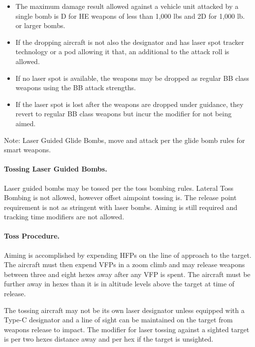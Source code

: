 \begin{itemize}

    \item The maximum damage result allowed against a vehicle unit attacked by a single bomb is D for HE weapons of less than 1,000 lbs and 2D for 1,000 lb. or larger bombs.

    \item If the dropping aircraft is not also the designator and has laser spot tracker technology or a pod allowing it that, an additional  to the attack roll is allowed.

    \item If no laser spot is available, the weapons may be dropped as regular BB class weapons using the BB attack strengths.

    \item {}If the laser spot is lost after the weapons are dropped under guidance, they revert to regular BB class weapons but incur the  modifier for not being aimed.

\end{itemize}

Note: Laser Guided Glide Bombs, move and attack per the glide bomb rules for smart weapons.

\paragraph{Tossing Laser Guided Bombs.} Laser guided bombs may be tossed per the toss bombing rules. Lateral Toss Bombing is not allowed, however offset aimpoint tossing is. The release point requirement is not as stringent with laser bombs. Aiming is still required and tracking time modifiers are not allowed.

\paragraph{Toss Procedure.} Aiming is accomplished by expending HFPs on the line of approach to the target. The aircraft must then expend VFPs in a zoom climb and may release weapons between three and eight hexes away after any VFP is spent. The aircraft must be further away in hexes than it is in altitude levels above the target at time of release.

The tossing aircraft may not be its own laser designator unless equipped with a Type-C designator and a line of sight can be maintained on the target from weapons release to impact. The modifier for laser tossing against a sighted target is  per two hexes distance away and  per hex if the target is unsighted.

